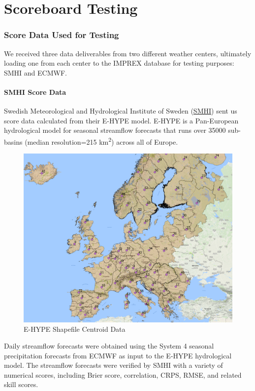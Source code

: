 \documentclass[logos,parttoc,morelanguage=french,morelanguage=german,draft]{orsay-memoire}
\begin{document}
\part{Scoreboard Testing}

\section{Score Data Used for Testing}

We received three data deliverables from two different weather centers, ultimately loading one from each center to the IMPREX database for testing purposes: SMHI and ECMWF.

\subsection{SMHI Score Data}

Swedish Meteorological and Hydrological Institute of Sweden (\href{http://www.smhi.se/en}{SMHI}) sent us score data calculated from their E-HYPE model. E-HYPE is a Pan-European hydrological model for seasonal streamflow forecasts that runs over 35000 sub-basins (median resolution=215 km\textsuperscript{2}) across all of Europe.

\begin{figure}[H]
\centering
\includegraphics[width=0.8\linewidth]{images/gisEHYPEcentroids.png}
  \caption{E-HYPE Shapefile Centroid Data}
  \label{fig:EHYPEdata}
\end{figure}

Daily streamflow forecasts were obtained using the System 4 seasonal precipitation forecasts from ECMWF as input to the E-HYPE hydrological model. The streamflow forecasts were verified by SMHI with a variety of numerical scores, including Brier score, correlation, CRPS, RMSE, and related skill scores.
\end{document}

